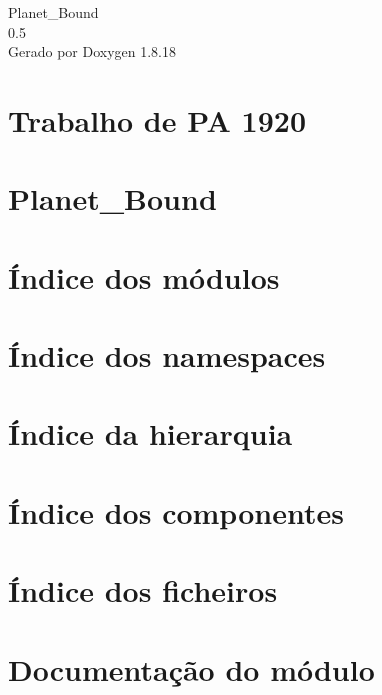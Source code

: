 \let\mypdfximage\pdfximage\def\pdfximage{\immediate\mypdfximage}\documentclass[twoside]{book}
\newcommand{\+}{\discretionary{\mbox{\scriptsize$\hookleftarrow$}}{}{}}
\newcommand{\clearemptydoublepage}{%
  \newpage{\pagestyle{empty}\cleardoublepage}%
}
\begin{document}
\hypersetup{pageanchor=false,
             bookmarksnumbered=true,
             pdfencoding=unicode
            }
\begin{titlepage}
\vspace*{7cm}
\begin{center}%
{\Large Planet\+\_\+\+Bound \\[1ex]\large 0.\+5 }\\
\vspace*{1cm}
{\large Gerado por Doxygen 1.8.18}\\
\end{center}
\end{titlepage}
\clearemptydoublepage
{}
\tableofcontents
\clearemptydoublepage
{}
\hypersetup{pageanchor=true}

\chapter{Trabalho de PA 1920}
\label{index}\hypertarget{index}{}
\chapter{Planet\+\_\+\+Bound}
\label{md_src_Planet_Bound_README}

\chapter{Índice dos módulos}

\chapter{Índice dos namespaces}

\chapter{Índice da hierarquia}

\chapter{Índice dos componentes}

\chapter{Índice dos ficheiros}

\chapter{Documentação do módulo}




\end{document}
